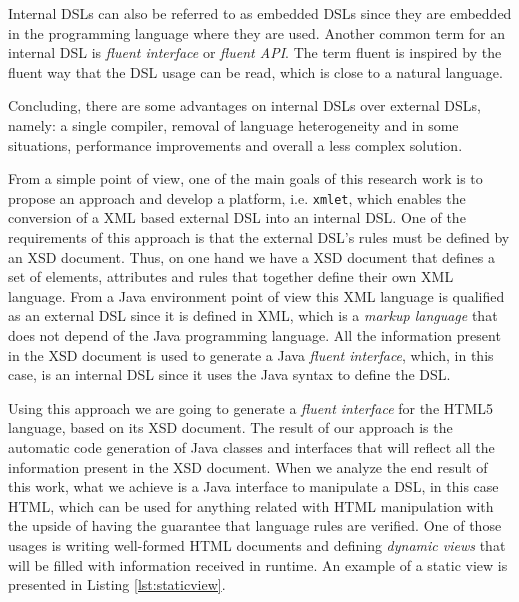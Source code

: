 \noindent
Internal \ac{DSL}s can also be referred to as embedded \ac{DSL}s since they are embedded in the programming language where they are used. Another common term for an internal \ac{DSL} is \textit{fluent interface} or \textit{fluent \ac{API}}. The term fluent is inspired by the fluent way that the \ac{DSL} usage can be read, which is close to a natural language.

\noindent
Concluding, there are some advantages on internal \ac{DSL}s over external \ac{DSL}s, namely: a single compiler, removal of language heterogeneity and in some situations, performance improvements and overall a less complex solution.

\noindent
From a simple point of view, one of the main goals of this research work is to propose an approach and develop a platform, i.e. \texttt{xmlet}, which enables the conversion of a \ac{XML} based external \ac{DSL} into an internal \ac{DSL}. One of the requirements of this approach is that the external \ac{DSL}'s rules must be defined by an \ac{XSD} document. Thus, on one hand we have a \ac{XSD} document that defines a set of elements, attributes and rules that together define their own \ac{XML} language. From a Java environment point of view this \ac{XML} language is qualified as an external \ac{DSL} since it is defined in \ac{XML}, which is a \textit{markup language} that does not depend of the Java programming language. All the information present in the \ac{XSD} document is used to generate a Java \textit{fluent interface}, which, in this case, is an internal \ac{DSL} since it uses the Java syntax to define the \ac{DSL}. 

\noindent
Using this approach we are going to generate a \textit{fluent interface} for the \ac{HTML}5 language, based on its \ac{XSD} document. The result of our approach is the automatic code generation of Java classes and interfaces that will reflect all the information present in the \ac{XSD} document. When we analyze the end result of this work, what we achieve is a Java interface to manipulate a \ac{DSL}, in this case \ac{HTML}, which can be used for anything related with \ac{HTML} manipulation with the upside of having the guarantee that language rules are verified. One of those usages is writing well-formed \ac{HTML} documents and defining \textit{dynamic views} that will be filled with information received in runtime. An example of a static view is presented in Listing \ref{lst:staticview}.

\bigskip


